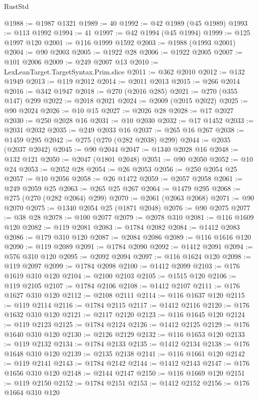 \begin{lexlean}{RustStd}
\begin{coremodule}
@1988 := @1987 @1321
@1989 := 40
@1992 := @42 @1989 (@45 @1989)
@1993 := @113 @1992
@1994 := 41
@1997 := @42 @1994 (@45 @1994)
@1999 := @125 @1997 @120
@2001 := @116 @1999 @1592
@2003 := @1988 (@1993 @2001)
@2004 := @90 @2003
@2005 := @1922 @28
@2006 := @1922 @2005
@2007 := @101 @2006
@2009 := @249 @2007 @13
@2010 := LexLeanTarget.TargetSyntax.Prim.slice
@2011 := @362 @2010
@2012 := @132 @1949
@2013 := @119 @2012
@2014 := @2011 @2013
@2015 := @266 @2014
@2016 := @342 @1947
@2018 := @270 (@2016 @285)
@2021 := @270 (@355 @147) @299
@2022 := @2018 @2021
@2024 := @2009 (@2015 @2022)
@2025 := @90 @2024
@2026 := @10 @15
@2027 := @2026 @28
@2028 := @17 @2027
@2030 := @250 @2028 @16
@2031 := @10 @2030
@2032 := @17 @1452
@2033 := @2031 @2032
@2035 := @249 @2033 @16
@2037 := @265 @16 @267
@2038 := @1459 @295
@2042 := @275 (@270 (@282 @2038) @299)
@2044 := @2035 (@2037 @2042)
@2045 := @90 @2044
@2047 := @1340 @2028 @16
@2048 := @132 @121
@2050 := @2047 (@1801 @2048)
@2051 := @90 @2050
@2052 := @10 @24
@2053 := @2052 @28
@2054 := @26 @2053
@2056 := @250 @2054 @25
@2057 := @10 @2056
@2058 := @26 @1472
@2059 := @2057 @2058
@2061 := @249 @2059 @25
@2063 := @265 @25 @267
@2064 := @1479 @295
@2068 := @275 (@270 (@282 @2064) @299)
@2070 := @2061 (@2063 @2068)
@2071 := @90 @2070
@2075 := @1340 @2054 @25 (@1871 @2048)
@2076 := @90 @2075
@2077 := @38 @28
@2078 := @100 @2077
@2079 := @2078 @310
@2081 := @116 @1609 @120
@2082 := @119 @2081
@2083 := @1784 @2082
@2084 := @1412 @2083
@2086 := @179 @310 @120
@2087 := @2084 @2086
@2089 := @116 @1616 @120
@2090 := @119 @2089
@2091 := @1784 @2090
@2092 := @1412 @2091
@2094 := @576 @310 @120
@2095 := @2092 @2094
@2097 := @116 @1624 @120
@2098 := @119 @2097
@2099 := @1784 @2098
@2100 := @1412 @2099
@2103 := @176 @1619 @310 @120
@2104 := @2100 @2103
@2105 := @1515 @120
@2106 := @119 @2105
@2107 := @1784 @2106
@2108 := @1412 @2107
@2111 := @176 @1627 @310 @120
@2112 := @2108 @2111
@2114 := @116 @1637 @120
@2115 := @119 @2114
@2116 := @1784 @2115
@2117 := @1412 @2116
@2120 := @176 @1632 @310 @120
@2121 := @2117 @2120
@2123 := @116 @1645 @120
@2124 := @119 @2123
@2125 := @1784 @2124
@2126 := @1412 @2125
@2129 := @176 @1640 @310 @120
@2130 := @2126 @2129
@2132 := @116 @1653 @120
@2133 := @119 @2132
@2134 := @1784 @2133
@2135 := @1412 @2134
@2138 := @176 @1648 @310 @120
@2139 := @2135 @2138
@2141 := @116 @1661 @120
@2142 := @119 @2141
@2143 := @1784 @2142
@2144 := @1412 @2143
@2147 := @176 @1656 @310 @120
@2148 := @2144 @2147
@2150 := @116 @1669 @120
@2151 := @119 @2150
@2152 := @1784 @2151
@2153 := @1412 @2152
@2156 := @176 @1664 @310 @120

\end{coremodule}
\end{lexlean}
